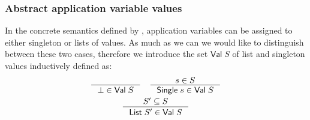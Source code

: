 \subsubsection{Abstract application variable values}
In the concrete semantics defined by \cite{halder_abstract_2012}, application variables can be assigned to either singleton or lists of values.
As much as we can we would like to distinguish between these two cases, therefore we introduce the set $\mathsf{Val} \; S$ of list and singleton values inductively defined as:
\begin{gather*}
    \inference{}{\bot \in \mathsf{Val} \; S} \quad
    \inference{s \in S}{\mathsf{Single} \; s \in \mathsf{Val} \; S}\\
    \inference{S' \subseteq S}{\mathsf{List} \; S' \in \mathsf{Val} \; S}
\end{gather*}

